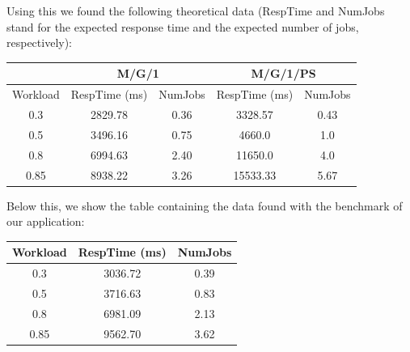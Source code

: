 \documentclass[11pt]{scrartcl} %
\begin{document}
Using this we found the following theoretical data (RespTime and NumJobs stand for the expected response time and the expected number of jobs, respectively):

\begin{table}[H]
\centering
\begin{tabular}{c|c|c|cc}
\multicolumn{1}{l|}{}         & \multicolumn{2}{c|}{M/G/1}                                                        & \multicolumn{2}{c}{M/G/1/PS}                                                     \\ \hline
\multicolumn{1}{l|}{Workload} & \multicolumn{1}{l|}{RespTime (ms)} & \multicolumn{1}{l|}{NumJobs} & \multicolumn{1}{l|}{RespTime (ms)} & \multicolumn{1}{l}{NumJobs} \\ \hline
0.3                           & 2829.78                            & 0.36                                         & \multicolumn{1}{c|}{3328.57}       & 0.43                                        \\
0.5                           & 3496.16                            & 0.75                                         & \multicolumn{1}{c|}{4660.0}        & 1.0                                         \\
0.8                           & 6994.63                            & 2.40                                         & \multicolumn{1}{c|}{11650.0}       & 4.0                                         \\
0.85                          & 8938.22                            & 3.26                                         & \multicolumn{1}{c|}{15533.33}      & 5.67                                       
\end{tabular}
\end{table}

Below this, we show the table containing the data found with the benchmark of our application:

\begin{table}[H]
\centering
\begin{tabular}{c|c|c|}
\multicolumn{1}{l|}{Workload} & \multicolumn{1}{l|}{RespTime (ms)} & \multicolumn{1}{l|}{NumJobs} \\ \hline
0.3                           & 3036.72                            & 0.39                         \\
0.5                           & 3716.63                            & 0.83                         \\
0.8                           & 6981.09                            & 2.13                         \\
0.85                          & 9562.70                            & 3.62                        
\end{tabular}
\end{table}
\end{document}
